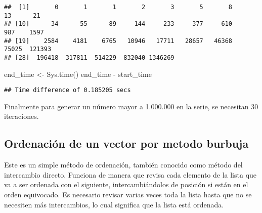\documentclass[]{elsarticle} %
\newenvironment{Shaded}{\begin{snugshade}}{\end{snugshade}}
\newcommand{\FunctionTok}[1]{\textcolor[rgb]{0.00,0.00,0.00}{#1}}
\newcommand{\NormalTok}[1]{#1}
\newcommand{\OtherTok}[1]{\textcolor[rgb]{0.56,0.35,0.01}{#1}}
\newcommand{\SpecialCharTok}[1]{\textcolor[rgb]{0.00,0.00,0.00}{#1}}
\begin{document}
\begin{verbatim}
##  [1]       0       1       1       2       3       5       8      13      21
## [10]      34      55      89     144     233     377     610     987    1597
## [19]    2584    4181    6765   10946   17711   28657   46368   75025  121393
## [28]  196418  317811  514229  832040 1346269
\end{verbatim}

\begin{Shaded}
\begin{Highlighting}[]
\NormalTok{end\_time }\OtherTok{\textless{}{-}} \FunctionTok{Sys.time}\NormalTok{()}
\NormalTok{end\_time }\SpecialCharTok{{-}}\NormalTok{ start\_time}
\end{Highlighting}
\end{Shaded}

\begin{verbatim}
## Time difference of 0.185205 secs
\end{verbatim}

Finalmente para generar un número mayor a 1.000.000 en la serie, se
necesitan 30 iteraciones.

\hypertarget{ordenaciuxf3n-de-un-vector-por-metodo-burbuja}{%
\subsection{Ordenación de un vector por metodo
burbuja}\label{ordenaciuxf3n-de-un-vector-por-metodo-burbuja}}

Este es un simple método de ordenación, también conocido como método del
intercambio directo. Funciona de manera que revisa cada elemento de la
lista que va a ser ordenada con el siguiente, intercambiándolos de
posición si están en el orden equivocado. Es necesario revisar varias
veces toda la lista hasta que no se necesiten más intercambios, lo cual
significa que la lista está ordenada.
\end{document}
